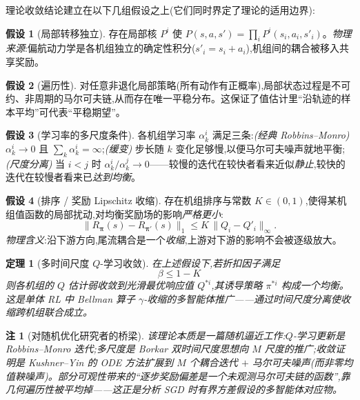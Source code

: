 \documentclass[12pt,a4paper]{article}
\theoremstyle{definition}
\newtheorem{assumption}{假设}
\theoremstyle{plain}
\newtheorem{theorem}{定理}
\newtheorem{remark}{注}
\newcommand{\bpi}{\bm{\pi}}
\begin{document}
理论收敛结论\cite{theory}建立在以下几组假设之上(它们同时界定了理论的适用边界):

\begin{assumption}[局部转移独立]
存在局部核 $P^i$ 使 $P(s,a,s')=\prod_i P^i(s_i,a_i,s'_i)$。\emph{物理来源}:偏航动力学是各机组独立的确定性积分($s'_i=s_i+a_i$),机组间的耦合被移入共享奖励。
\end{assumption}

\begin{assumption}[遍历性]
对任意非退化局部策略(所有动作有正概率),局部状态过程是不可约、非周期的马尔可夫链,从而存在唯一平稳分布。这保证了值估计里“沿轨迹的样本平均”可代表“平稳期望”。
\end{assumption}

\begin{assumption}[学习率的多尺度条件]
各机组学习率 $\alpha^i_k$ 满足三条:\emph{(经典 Robbins--Monro)} $\alpha^i_k\to0$ 且 $\sum_k\alpha^i_k=\infty$;\emph{(缓变)} 步长随 $k$ 变化足够慢,以便马尔可夫噪声就地平衡;\emph{(尺度分离)} 当 $i<j$ 时 $\alpha^i_k/\alpha^j_k\to0$——较慢的迭代在较快者看来近似\emph{静止},较快的迭代在较慢者看来已\emph{达到均衡}。
\end{assumption}

\begin{assumption}[排序 / 奖励 Lipschitz 收缩]
存在机组排序与常数 $K\in(0,1)$,使得某机组值函数的局部扰动,对均衡奖励场的影响\emph{严格更小}:
\begin{equation}
  \big\|R_{\bpi}(s)-R_{\bpi'}(s)\big\|_1\le K\,\big\|Q_i-Q'_i\big\|_\infty.
  \label{eq:contract}
\end{equation}
\emph{物理含义}:沿下游方向,尾流耦合是一个\emph{收缩},上游对下游的影响不会被逐级放大。
\end{assumption}

\begin{theorem}[多时间尺度 $Q$-学习收敛]
在上述假设下,若折扣因子满足
\begin{equation}
  \boxed{\ \beta\le 1-K\ }
  \label{eq:beta}
\end{equation}
则各机组的 $Q$ 估计弱收敛到光滑最优响应值 $Q^{*i}$,其诱导策略 $\pi^{*i}$ 构成一个\emph{均衡}。这是单体 RL 中 Bellman 算子 $\gamma$-收缩的多智能体推广——通过时间尺度分离使收缩\emph{跨机组联合}成立。
\end{theorem}

\begin{remark}[对随机优化研究者的桥梁]
该理论本质是一篇\emph{随机逼近}工作:$Q$-学习更新是 Robbins--Monro 迭代;多尺度是 Borkar 双时间尺度思想向 $M$ 尺度的推广;收敛证明是 Kushner--Yin 的 ODE 方法扩展到 $M$ 个耦合迭代 $+$ \emph{马尔可夫噪声}(而非零均值鞅噪声)。部分可观性带来的“逐步奖励偏差是一个未观测马尔可夫链的函数”,靠几何遍历性被平均掉——这正是分析 SGD 时有界方差假设的多智能体对应物。
\end{remark}
\end{document}

